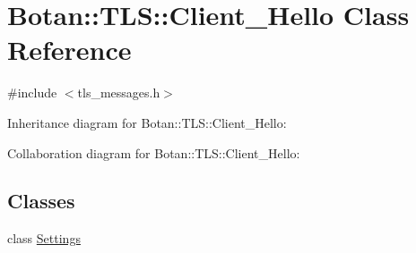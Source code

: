 \hypertarget{class_botan_1_1_t_l_s_1_1_client___hello}{}\section{Botan\+:\+:T\+LS\+:\+:Client\+\_\+\+Hello Class Reference}
\label{class_botan_1_1_t_l_s_1_1_client___hello}


{\ttfamily \#include $<$tls\+\_\+messages.\+h$>$}



Inheritance diagram for Botan\+:\+:T\+LS\+:\+:Client\+\_\+\+Hello\+:


Collaboration diagram for Botan\+:\+:T\+LS\+:\+:Client\+\_\+\+Hello\+:
\subsection*{Classes}
\begin{DoxyCompactItemize}
\item 
class \mbox{\hyperlink{class_botan_1_1_t_l_s_1_1_client___hello_1_1_settings}{Settings}}
\end{DoxyCompactItemize}
